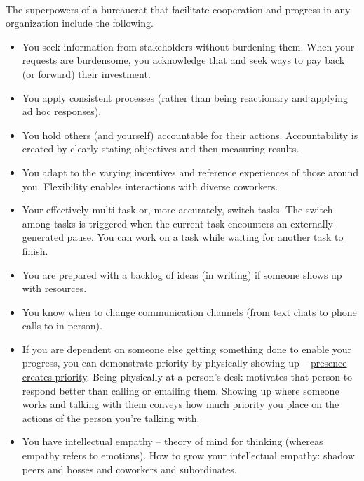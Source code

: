 \ \\

The superpowers of a bureaucrat that facilitate cooperation and progress in any organization include the following.
\begin{itemize}
\item You seek information from stakeholders without burdening them. When your requests are burdensome, you acknowledge that and seek ways to pay back (or forward) their investment.
\item You apply consistent processes (rather than being reactionary and applying ad hoc responses).
\item You hold others (and yourself) accountable for their actions. Accountability is created by clearly stating objectives and then measuring results.
\item You adapt to the varying incentives and reference experiences of those around you. Flexibility enables interactions with diverse coworkers. 
    \item Your effectively multi-task or, more accurately, switch tasks. The switch among tasks is triggered when the current task encounters an externally-generated pause. You can \href{https://en.wikipedia.org/wiki/Pipeline_(computing)\%23Concept_and_motivation}{work on a task while waiting for another task to finish}. 
\iftoggle{WPinmargin}{\marginpar{$>$Wikipedia: pipeline (computing)}}{}
    \item You are prepared with a backlog of ideas (in writing) if someone shows up with resources.
    \item You know when to change communication channels (from text chats to phone calls to in-person). 
    \item If you are dependent on someone else getting something done to enable your progress, you can demonstrate priority by physically showing up -- \underline{presence creates priority}. 
    Being physically at a person's desk motivates that person to respond better than calling  or emailing them. Showing up where someone works and talking with them conveys how much priority you place on the actions of the person you're talking with.
    \item You have intellectual empathy -- theory of mind for thinking (whereas empathy refers to emotions). How to grow your intellectual empathy: shadow peers and bosses and coworkers and subordinates.

\end{itemize}
